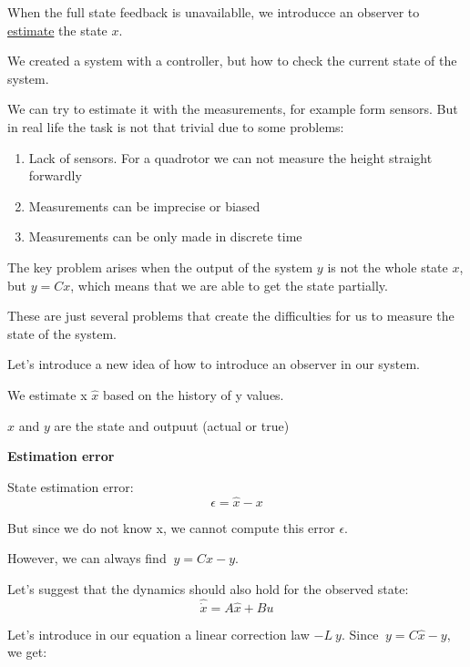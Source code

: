 When the full state feedback is unavailablle, we introducce an observer to \underline{estimate} the state $x$.




We created a system with a controller, but how to check the current state of the system.

We can try to estimate it with the measurements, for example form sensors. But in real life 
the task is not that trivial due to some problems:

\begin{enumerate}
    \item Lack of sensors. For a quadrotor we can not measure the height straight forwardly 
    \item Measurements can be imprecise or biased
    \item Measurements can be only made in discrete time
\end{enumerate}

The key problem arises when the output of the system $y$ is not the whole state $x$, but $y = Cx$, which
means that we are able to get the state partially.

These are just several problems that create the difficulties for us to measure the state of the system. 


Let's introduce a new idea of how to introduce an observer in our system. 


We estimate x $\hat x$ based on the history of y values. 


$x$ and $y$ are the state and outpuut (actual or true)

\textbf{Estimation error}

State estimation error:
\[\epsilon = \hat x - x\]

But since we do not know x, we cannot compute this error $\epsilon$.

However, we can always find $~ y = C \hat x - y$. 

Let's suggest that the dynamics should also hold for the observed state:
\[\hat \dot x = A \hat x + Bu\]

Let's introduce in our equation a linear correction law $-L ~y$. 
Since $~y = C \hat x - y$, we get:


